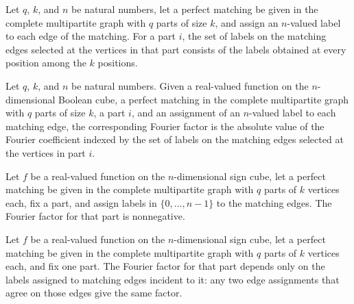 \begin{definition}
\label{FABL.graphMatchingEdgeLabelSet}
\leanok
{}
Let $q$, $k$, and $n$ be natural numbers, let a perfect matching be given in the
complete multipartite graph with $q$ parts of size $k$, and assign an $n$-valued label
to each edge of the matching. For a part $i$, the set of labels on the matching edges
selected at the vertices in that part consists of the labels obtained at every position
among the $k$ positions.
\end{definition}

\begin{definition}
\label{FABL.graphMatchingEdgeFourierFactor}
\leanok
{}
Let $q$, $k$, and $n$ be natural numbers. Given a real-valued function on the
$n$-dimensional Boolean cube, a perfect matching in the complete multipartite graph with
$q$ parts of size $k$, a part $i$, and an assignment of an $n$-valued label to each
matching edge, the corresponding Fourier factor is the absolute value of the Fourier
coefficient indexed by the set of labels on the matching edges selected at the vertices
in part $i$.
\end{definition}

\begin{theorem}
\label{FABL.graphMatchingEdgeFourierFactor_nonneg}
\leanok
{}
Let $f$ be a real-valued function on the $n$-dimensional sign cube, let a perfect
matching be given in the complete multipartite graph with $q$ parts of $k$ vertices
each, fix a part, and assign labels in $\{0,\ldots,n-1\}$ to the matching edges. The
Fourier factor for that part is nonnegative.
\end{theorem}

\begin{theorem}
\label{FABL.graphMatchingEdgeFourierFactor_dependsOn}
\leanok
{}
Let $f$ be a real-valued function on the $n$-dimensional sign cube, let a perfect
matching be given in the complete multipartite graph with $q$ parts of $k$ vertices
each, and fix one part. The Fourier factor for that part depends only on the labels
assigned to matching edges incident to it: any two edge assignments that agree on those
edges give the same factor.
\end{theorem}

